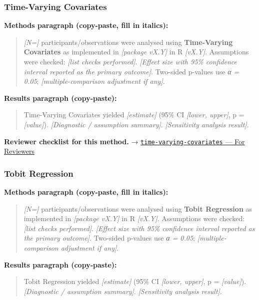 \documentclass[
]{article}
\begin{document}
\subsubsection{Time-Varying Covariates}\label{time-varying-covariates}

\textbf{Methods paragraph (copy-paste, fill in italics):}

\begin{quote}
\emph{{[}N={]}} participants/observations were analysed using
\textbf{Time-Varying Covariates} as implemented in \emph{{[}package
vX.Y{]}} in R \emph{{[}vX.Y{]}}. Assumptions were checked: \emph{{[}list
checks performed{]}}. \emph{{[}Effect size with 95\% confidence interval
reported as the primary outcome{]}}. Two-sided p-values use \emph{α =
0.05}; \emph{{[}multiple-comparison adjustment if any{]}}.
\end{quote}

\textbf{Results paragraph (copy-paste):}

\begin{quote}
Time-Varying Covariates yielded \emph{{[}estimate{]}} (95\% CI
\emph{{[}lower, upper{]}}, p = \emph{{[}value{]}}). \emph{{[}Diagnostic
/ assumption summary{]}}. \emph{{[}Sensitivity analysis result{]}}.
\end{quote}

\textbf{Reviewer checklist for this method.} →
\href{../chapters/11-survival/time-varying-covariates.Rmd\#for-reviewers}{\texttt{time-varying-covariates}
--- For Reviewers}

\subsubsection{Tobit Regression}\label{tobit-regression}

\textbf{Methods paragraph (copy-paste, fill in italics):}

\begin{quote}
\emph{{[}N={]}} participants/observations were analysed using
\textbf{Tobit Regression} as implemented in \emph{{[}package vX.Y{]}} in
R \emph{{[}vX.Y{]}}. Assumptions were checked: \emph{{[}list checks
performed{]}}. \emph{{[}Effect size with 95\% confidence interval
reported as the primary outcome{]}}. Two-sided p-values use \emph{α =
0.05}; \emph{{[}multiple-comparison adjustment if any{]}}.
\end{quote}

\textbf{Results paragraph (copy-paste):}

\begin{quote}
Tobit Regression yielded \emph{{[}estimate{]}} (95\% CI \emph{{[}lower,
upper{]}}, p = \emph{{[}value{]}}). \emph{{[}Diagnostic / assumption
summary{]}}. \emph{{[}Sensitivity analysis result{]}}.
\end{quote}
\end{document}
